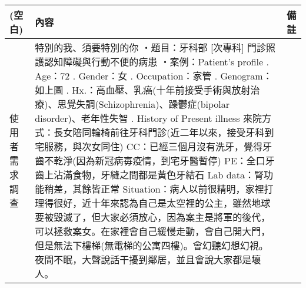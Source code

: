 \documentclass[12pt, a4paper]{article}
\begin{document}
\begin{xltabular}{1.0\linewidth}[c]{|p{2.3cm}|p{12.4cm}|l|} %
\caption{}
\label{tab:my-table}\\
\hline
(空白) &
  內容 &
  備註 \\ \hline
\endfirsthead
%
%
使用者需求調查 &
  特別的我、須要特別的你\newline
  ‧題目：牙科部 [次專科] 門診照護認知障礙與行動不便的病患\newline 
  ‧案例：Patient's profile . Age：72 . Gender：女 . Occupation：家管 . Genogram：如上圖 . Hx.：高血壓、乳癌(十年前接受手術與放射治療)、思覺失調(Schizophrenia)、躁鬱症(bipolar disorder)、老年性失智 . History of Present illness  \newline 
     來院方式：長女陪同輪椅前往牙科門診(近二年以來，接受牙科到宅服務，與次女同住)  \newline 
     CC：已經三個月沒有洗牙，覺得牙齒不乾淨(因為新冠病毐疫情，到宅牙醫暫停) \newline 
     PE：全口牙齒上沾滿食物，牙縫之間都是黃色牙結石  \newline 
     Lab data：腎功能稍差，其餘皆正常  \newline 
     Situation：病人以前很精明，家裡打理得很好，近十年來認為自己是太空裡的公主，雖然地球要被毀滅了，但大家必須放心，因為案主是將軍的後代，可以拯救案女。在家裡會自己緩慢走動，會自己開大門，但是無法下樓梯(無電梯的公寓四樓)。會幻聽幻想幻視。夜間不眠，大聲說話干擾到鄰居，並且會說大家都是壞人。\newline 
   &
  \\  \hline

\end{xltabular}
\end{document}
